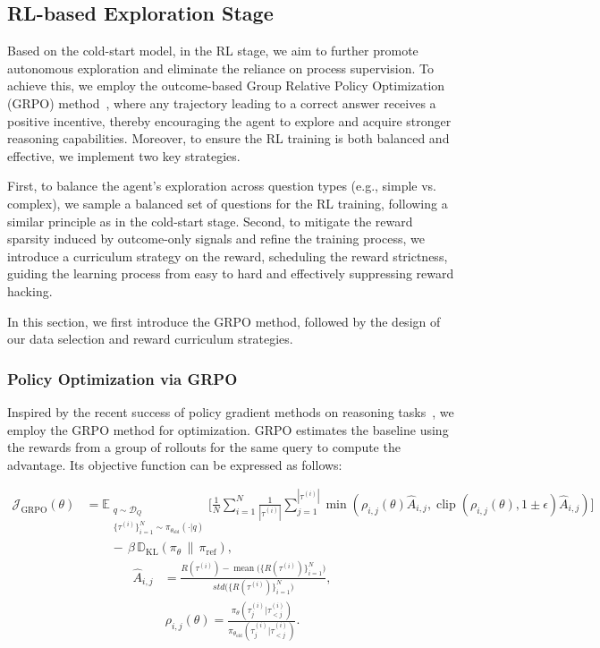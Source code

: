 \subsection{RL-based Exploration Stage}
Based on the cold-start model, in the RL stage, we aim to further promote autonomous exploration and eliminate the reliance on process supervision. To achieve this, we employ the outcome-based Group Relative Policy Optimization (GRPO) method~\citep{shao2024deepseekmath}, where any trajectory leading to a correct answer receives a positive incentive, thereby encouraging the agent to explore and acquire stronger reasoning capabilities. Moreover, to ensure the RL training is both balanced and effective, we implement two key strategies. 

First, to balance the agent's exploration across question types (e.g., simple vs. complex), we sample a balanced set of questions for the RL training, following a similar principle as in the cold-start stage. Second, to mitigate the reward sparsity induced by outcome-only signals and refine the training process, we introduce a curriculum strategy on the reward, scheduling the reward strictness, guiding the learning process from easy to hard and effectively suppressing reward hacking.

In this section, we first introduce the GRPO method, followed by the design of our data selection and reward curriculum strategies.

\subsubsection{Policy Optimization via GRPO}
Inspired by the recent success of policy gradient methods on reasoning tasks~\citep{jin2025search,xue2025simpletir,luo2025graph}, we employ the GRPO method for optimization. GRPO estimates the baseline using the rewards from a group of rollouts for the same query to compute the advantage. Its objective function can be expressed as follows:


\begin{align}
\mathcal{J}_{\mathrm{GRPO}}(\theta)
&=
\mathbb{E}_{\substack{q \sim \mathcal{D}_Q\\ \{\tau^{(i)}\}_{i=1}^N \sim \pi_{\theta_{\text{old}}}(\cdot|q)}}
\Bigg[
  \frac{1}{N}\sum_{i=1}^N \frac{1}{|\tau^{(i)}|}
  \sum_{j=1}^{|\tau^{(i)}|}
  \min(\rho_{i,j}(\theta)\hat{A}_{i,j}, \operatorname{clip}(\rho_{i,j}(\theta), 1 \pm \epsilon)\hat{A}_{i,j})
\Bigg]
\\[10pt]  
&\nonumber \qquad -\,\beta\,\mathbb{D}_{\mathrm{KL}}(\pi_\theta \,\|\, \pi_{\text{ref}}),
\end{align}
\begin{align}
\hat{A}_{i,j} &=  
\frac{R(\tau^{(i)}) - \operatorname{mean}\big(\{R(\tau^{(i)})\}_{i=1}^N\big)}
     {std\big(\{R(\tau^{(i)})\}_{i=1}^N\big)},
\end{align}
\begin{align}
\rho_{i,j}(\theta) = \frac{\pi_\theta(\tau_{j}^{(i)} | \tau_{<j}^{(i)})}{\pi_{\theta_\text{old}}(\tau_{j}^{(i)} | \tau_{<j}^{(i)})}.
\end{align}

